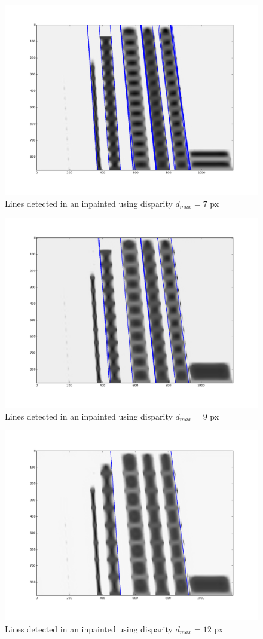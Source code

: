 \begin{itemize}
\begin{figure}[h!]
\centering
\includegraphics[width = 0.7 \textwidth]{./Diagrams/results/Disparity_benchmark/673_10_102_7_48_8_lines.png}
\caption{Lines detected in an inpainted using disparity $d_{max} = 7$ px}
\label{fig:second_lines_disparity}
\end{figure}

\begin{figure}[h!]
\centering
\includegraphics[width = 0.7 \textwidth]{./Diagrams/results/Disparity_benchmark/673_10_102_9_48_8_lines.png}
\caption{Lines detected in an inpainted using disparity $d_{max} = 9$ px}
\label{fig:third_lines_disparity}
\end{figure}

\begin{figure}[h!]
\centering
\includegraphics[width = 0.7 \textwidth]{./Diagrams/results/Disparity_benchmark/673_10_102_12_48_8_lines.png}
\caption{Lines detected in an inpainted using disparity $d_{max} = 12$ px}
\label{fig:fourth_lines_disparity}
\end{figure}


\end{itemize}
